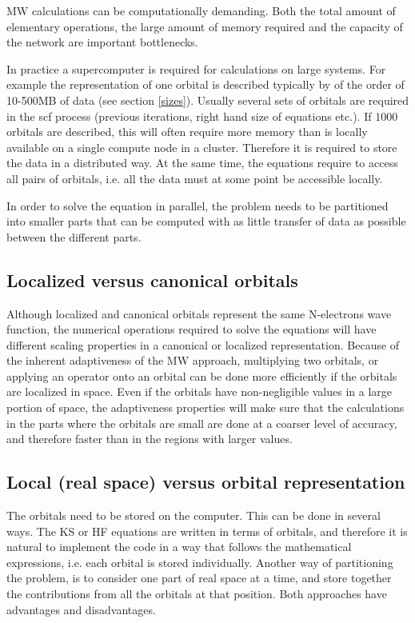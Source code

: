 \documentclass[%
 aip,
 amsmath,amssymb,
 reprint,%
]{revtex4-1}
\begin{document}
MW calculations can be computationally demanding. Both the total amount of elementary operations, the large amount of memory required and the capacity of the network are important bottlenecks. 

In practice a supercomputer is required for calculations on large systems.
For example the representation of one orbital is described typically by of the order of 10-500MB of data (see section \ref{sizes}). Usually several sets of orbitals are required in the scf process (previous iterations, right hand size of equations etc.). If 1000 orbitals are described, this will often require more memory than is locally available on a single compute node in a cluster. Therefore it is required to store the data in a distributed way. At the same time, the equations require to access all pairs of orbitals, i.e. all the data must at some point be accessible locally.

In order to solve the equation in parallel, the problem needs to be partitioned into smaller parts that can be computed with as little transfer of data as possible between the different parts.



\subsection{Localized versus canonical orbitals}

Although localized and canonical orbitals represent the same N-electrons wave function, the numerical operations required to solve the equations will have different scaling properties in a canonical or localized representation.
Because of the inherent adaptiveness of the MW approach, multiplying two orbitals, or applying an operator onto an orbital can be done more efficiently if the orbitals are localized in space. Even if the orbitals have non-negligible values in a large portion of space, the adaptiveness properties will make sure that the calculations in the parts where the orbitals are small are done at a coarser level of accuracy, and therefore faster than in the regions with larger values.

\subsection{Local (real space) versus orbital representation}

The orbitals need to be stored on the computer. This can be done in several ways. The KS or HF equations are written in terms of orbitals, and therefore it is natural to implement the code in a way that follows the mathematical expressions, i.e. each orbital is stored individually. Another way of partitioning the problem, is to consider one part of real space at a time, and store together the contributions from all the orbitals at that position. Both approaches have advantages and disadvantages.
\end{document}
